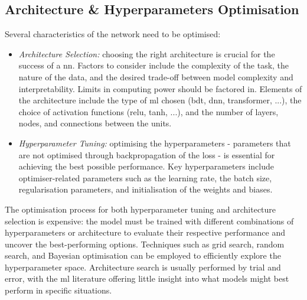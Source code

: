 \subsection{Architecture \& Hyperparameters Optimisation}
Several characteristics of the network need to be optimised: 
\begin{itemize}[leftmargin=*]
    \item \textit{Architecture Selection:} choosing the right architecture is crucial for the success of a \gls{nn}. Factors to consider include the complexity of the task, the nature of the data, and the desired trade-off between model complexity and interpretability. Limits in computing power should be factored in. Elements of the architecture include the type of \gls{ml} chosen (\gls{bdt}, \gls{dnn}, transformer, ...), the choice of activation functions (\gls{relu}, tanh, ...), and the number of layers, nodes, and connections between the units.
    \item \textit{Hyperparameter Tuning:} optimising the hyperparameters - parameters that are not optimised through backpropagation of the loss - is essential for achieving the best possible performance. Key hyperparameters include optimiser-related parameters such as the learning rate, the batch size, regularisation parameters, and initialisation of the weights and biases.
\end{itemize}
The optimisation process for both hyperparameter tuning and architecture selection is expensive: the model must be trained with different combinations of hyperparameters or architecture to evaluate their respective performance and uncover the best-performing options. Techniques such as grid search, random search, and Bayesian optimisation can be employed to efficiently explore the hyperparameter space. Architecture search is usually performed by trial and error, with the \gls{ml} literature offering little insight into what models might best perform in specific situations. 

